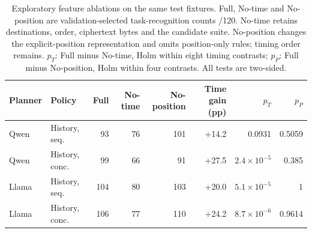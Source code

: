 \begin{table}[t]\centering\footnotesize
\caption{Exploratory feature ablations on the same test fixtures. Full, No-time and No-position are validation-selected task-recognition counts /120. No-time retains destinations, order, ciphertext bytes and the candidate suite. No-position changes the explicit-position representation and omits position-only rules; timing order remains. $p_T$: Full minus No-time, Holm within eight timing contrasts; $p_P$: Full minus No-position, Holm within four contrasts. All tests are two-sided.}\label{tab:feature-ablation}
\setlength{\tabcolsep}{3pt}
\begin{tabularx}{\textwidth}{@{}llrrrrrr@{}}\toprule
Planner & Policy & Full & No-time & No-position & Time gain (pp) & $p_T$ & $p_P$ \\\midrule
Qwen & History, seq. & 93 & 76 & 101 & +14.2 & 0.0931 & 0.5059 \\
Qwen & History, conc. & 99 & 66 & 91 & +27.5 & $2.4\!\times\!10^{-5}$ & 0.385 \\
Llama & History, seq. & 104 & 80 & 103 & +20.0 & $5.1\!\times\!10^{-5}$ & 1 \\
Llama & History, conc. & 106 & 77 & 110 & +24.2 & $8.7\!\times\!10^{-6}$ & 0.9614 \\
\bottomrule\end{tabularx}\end{table}
